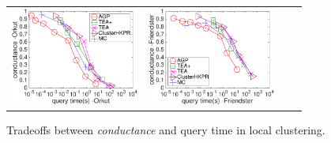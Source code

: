 \begin{figure}[t]
	\begin{small}
		\centering
		\vspace{-2mm}
		\begin{tabular}{cccc}
			\hspace{-4mm} \includegraphics[height=32mm]{./Figs/HKPR-conductance-query-OL.eps} &
			\hspace{-4mm} \includegraphics[height=32mm]{./Figs/HKPR-conductance-query-FR.eps} &
		\end{tabular}
		\vspace{-5mm}
		\caption{Tradeoffs between {\em conductance} and query time in local clustering.}
		\label{fig:HKPR-conductance-query}
		\vspace{-4mm}
	\end{small}
\end{figure}

